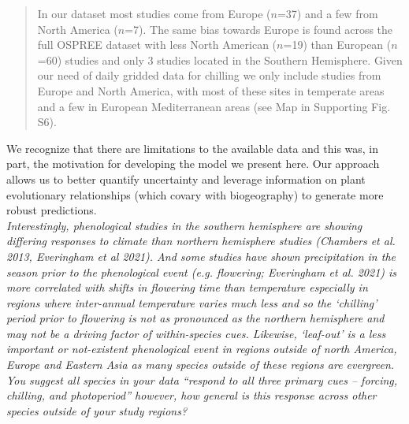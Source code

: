\documentclass[11pt]{article}
\begin{document}
\begin{quote} %
In our dataset most studies come from Europe ($n$=37) and a few from North America ($n$=7). The same bias towards Europe is found across the full OSPREE dataset with less North American ($n$=19) than European ($n$=60) studies and only 3 studies located in the Southern Hemisphere. Given our need of daily gridded data for chilling we only include studies from Europe and North America, with most of these sites in temperate areas and a few in European Mediterranean areas (see Map in Supporting Fig. S6).
\end{quote}

We recognize that there are limitations to the available data and this was, in part, the motivation for developing the model we present here. Our approach allows us to better quantify uncertainty and leverage information on plant evolutionary relationships (which covary with biogeography) to generate more robust predictions.\\ %

\emph{Interestingly, phenological studies in the southern hemisphere are showing differing responses to climate than northern hemisphere studies (Chambers et al. 2013, Everingham et al 2021). And some studies have shown precipitation in the season prior to the phenological event (e.g. flowering; Everingham et al. 2021) is more correlated with shifts in flowering time than temperature especially in regions where inter-annual temperature varies much less and so the ‘chilling’ period prior to flowering is not as pronounced as the northern hemisphere and may not be a driving factor of within-species cues. Likewise, ‘leaf-out’ is a less important or not-existent phenological event in regions outside of north America, Europe and Eastern Asia as many species outside of these regions are evergreen. You suggest all species in your data “respond to all three primary cues – forcing, chilling, and photoperiod” however, how general is this response across other species outside of your study regions?}\\

\end{document}
